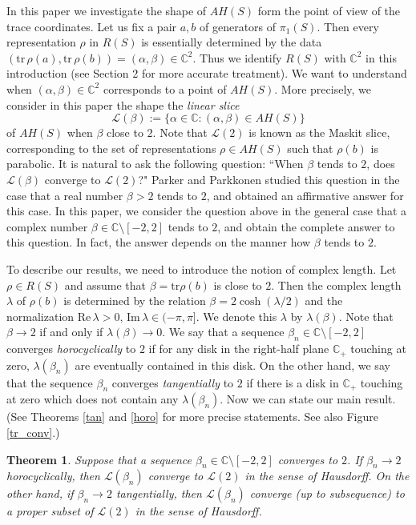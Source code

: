 \documentclass[12pt]{article}
\theoremstyle{plain}
\newtheorem{thm}{Theorem}[section]
\theoremstyle{definition}
\theoremstyle{remark}
\newcommand{\C}{\mathbb C}
\newcommand{\LL}{\mathcal L}
\newcommand{\lam}{\lambda}
\newcommand{\alp}{\alpha}
\newcommand{\sm}{\setminus}
\newcommand{\tr}{{\mathrm{tr}}}
\newcommand{\im}{\mathrm{Im}}
\newcommand{\re}{\mathrm{Re}}
\begin{document}
In this paper we investigate the shape of $AH(S)$ form the point of view of the trace coordinates. 
Let us fix a pair $a,b$ of generators of $\pi_1(S)$. 
Then every representation $\rho$ in $R(S)$ is essentially 
determined by the data $(\tr \,\rho(a),\tr\,\rho(b))=(\alp,\beta)  \in \C^2$. 
Thus we identify $R(S)$ with $\C^2$ in this introduction (see Section 2 for more accurate treatment). 
We want to understand when $(\alp,\beta) \in \C^2$ corresponds to a point of  $AH(S)$. 
More precisely, we consider in this paper the shape the {\it linear slice}  
$$
\LL(\beta):=\{\alp \in \C : (\alp,\beta) \in AH(S)\}
$$
of $AH(S)$ 
when $\beta$ close to $2$. 
Note that $\LL(2)$ is known as the Maskit slice, corresponding to the set of representations 
$\rho \in AH(S)$ such that $\rho(b)$ is parabolic. 
It is natural to ask the following question:  
``When $\beta$ tends to $2$,  does $\LL(\beta)$ converge to $\LL(2)$?" 
Parker and Parkkonen \cite{PP}  studied this question 
in the case that  a real number $\beta>2$ tends to $2$, 
and obtained an affirmative answer for this case.  
In this paper, we consider the question above in the general case 
that  a complex number $\beta  \in \C \sm [-2,2]$ tends to $2$, 
and obtain the complete answer  to this question. 
In fact, the answer depends on the manner how $\beta$ tends to $2$. 

To describe our results, we need to introduce the notion of complex length.  
Let  $\rho \in R(S)$ and assume that 
$\beta=\tr \rho(b)$ is close to $2$. 
Then the complex length $\lam$ of $\rho(b)$ is determined by the relation 
$
\beta=2\cosh (\lam/2)
$
 and the normalization $\re\,\lam>0,\,\im\,\lam \in (-\pi,\pi]$.
  We denote this $\lam$ by $\lam(\beta)$. 
  Note that $\beta \to 2$ if and only if $\lam(\beta) \to 0$. 
We say that a sequence $\beta_n \in \C \sm[-2,2]$ 
converges {\it horocyclically}  to $2$ if for any disk 
in the right-half plane  $\C_+$ touching at zero,  
$\lam(\beta_n)$ are eventually contained in this disk. 
On the other hand, 
we say that  the sequence $\beta_n$ converges {\it tangentially} to $2$   
if there is a disk in $\C_+$ touching at zero 
which does not contain any $\lam(\beta_n)$.  
Now we can state our main result.  (See Theorems \ref{tan} and \ref{horo} for more precise statements. 
See also Figure \ref{tr_conv}.) 

\begin{thm}
Suppose that a sequence $\beta_n \in \C \sm [-2,2]$ converges to $2$. 
If  $\beta_n \to 2$ horocyclically, then $\LL(\beta_n)$ converge to $\LL(2)$ in the sense of 
Hausdorff. 
On the other hand, if $\beta_n \to 2$ tangentially, 
then $\LL(\beta_n)$ converge (up to subsequence) to a proper subset of $\LL(2)$ in the sense of Hausdorff. 
\end{thm}
\end{document}
